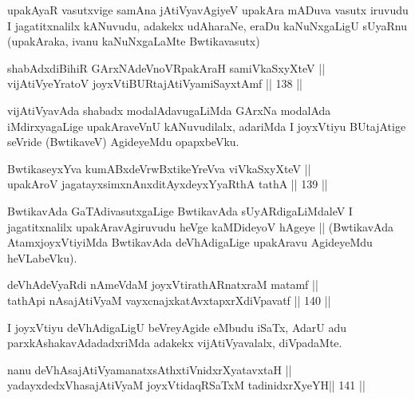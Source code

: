 \begin{artha}
upakAyaR vasutxvige samAna jAtiVyavAgiyeV upakAra mADuva vasutx iruvudu I jagatitxnalilx kANuvudu, adakekx udAharaNe, eraDu kaNuNxgaLigU sUyaRnu (upakAraka, ivanu kaNuNxgaLaMte Bwtikavasutx)
\end{artha}

\begin{shl}
shabAdxdiBihiR GArxNAdeVnoVRpakAraH samiVkaSxyXteV ||  \\
vijAtiVyeYratoV joyxVtiBURtajAtiVyamiSayxtAmf \hfill||  138 ||  
\end{shl}

\begin{artha}
vijAtiVyavAda shabadx modalAdavugaLiMda GArxNa modalAda iMdirxyagaLige upakAraveVnU kANuvudilalx, adariMda I joyxVtiyu BUtajAtige seVride (BwtikaveV) AgideyeMdu opapxbeVku.
\end{artha}

\begin{shl}
BwtikaseyxYva kumABxdeVrwBxtikeYreVva viVkaSxyXteV ||  \\
upakAroV jagatayxsimxnAnxditAyxdeyxYyaRthA tathA \hfill||  139 ||  
\end{shl}

\begin{artha}
BwtikavAda GaTAdivasutxgaLige BwtikavAda sUyARdigaLiMdaleV I jagatitxnalilx upakAravAgiruvudu heVge kaMDideyoV hAgeye || (BwtikavAda AtamxjoyxVtiyiMda BwtikavAda deVhAdigaLige upakAravu AgideyeMdu heVLabeVku).
\end{artha}


\begin{shl}
deVhAdeVyaRdi nAmeVdaM joyxVtirathARnatxraM matamf ||  \\
tathA\s pi nAsajAtiVyaM vayxcnajxkatAvxtapxrXdiVpavatf \hfill||  140 ||  
\end{shl}

\begin{artha}
I joyxVtiyu deVhAdigaLigU beVreyAgide eMbudu iSaTx, AdarU adu parxkAshakavAdadadxriMda adakekx vijAtiVyavalalx, diVpadaMte.
\end{artha}


\begin{shl}
nanu deVhAsajAtiVyamanatxsAthxtiVnidxrXyatavxtaH ||  \\
yadayxdedxVhasajAtiVyaM joyxVtidaqRSaTxM tadinidxrXyeYH\hfill ||  141 ||  
\end{shl}

